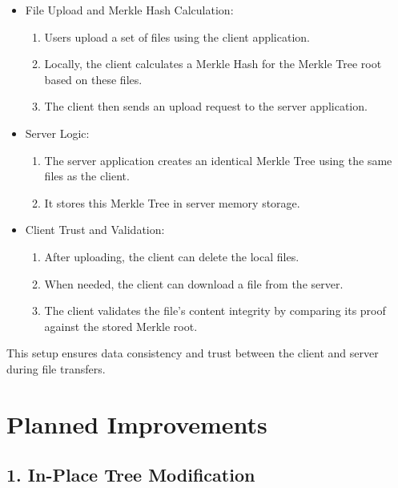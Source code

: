 \documentclass[journal]{IEEEtran}
\begin{document}
\begin{itemize}
  \item File Upload and Merkle Hash Calculation:
  \begin{enumerate}
    \item Users upload a set of files using the client application.
    \item Locally, the client calculates a Merkle Hash for the Merkle Tree root based on these files.
    \item The client then sends an upload request to the server application.
  \end{enumerate}
  \item Server Logic:
  \begin{enumerate}
    \item The server application creates an identical Merkle Tree using the same files as the client.
    \item It stores this Merkle Tree in server memory storage.
  \end{enumerate}
  \item Client Trust and Validation:
  \begin{enumerate}
    \item After uploading, the client can delete the local files.
    \item When needed, the client can download a file from the server.
    \item The client validates the file’s content integrity by comparing its proof against the stored Merkle root.
  \end{enumerate}
\end{itemize}
This setup ensures data consistency and trust between the client and server during file transfers.

\section{Planned Improvements}
\subsection*{1. In-Place Tree Modification}
\end{document}
